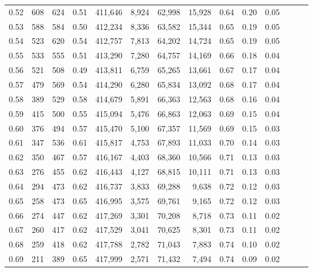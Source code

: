 \begin{tabular}{rrrrrrrrrrrrrr}
0.52 &     608 &    624 &  0.51 &  411,646 &    8,924 &  62,998 &  15,928 &  0.64 &  0.20 &      0.05 \\
0.53 &     588 &    584 &  0.50 &  412,234 &    8,336 &  63,582 &  15,344 &  0.65 &  0.19 &      0.05 \\
0.54 &     523 &    620 &  0.54 &  412,757 &    7,813 &  64,202 &  14,724 &  0.65 &  0.19 &      0.05 \\
0.55 &     533 &    555 &  0.51 &  413,290 &    7,280 &  64,757 &  14,169 &  0.66 &  0.18 &      0.04 \\
0.56 &     521 &    508 &  0.49 &  413,811 &    6,759 &  65,265 &  13,661 &  0.67 &  0.17 &      0.04 \\
0.57 &     479 &    569 &  0.54 &  414,290 &    6,280 &  65,834 &  13,092 &  0.68 &  0.17 &      0.04 \\
0.58 &     389 &    529 &  0.58 &  414,679 &    5,891 &  66,363 &  12,563 &  0.68 &  0.16 &      0.04 \\
0.59 &     415 &    500 &  0.55 &  415,094 &    5,476 &  66,863 &  12,063 &  0.69 &  0.15 &      0.04 \\
0.60 &     376 &    494 &  0.57 &  415,470 &    5,100 &  67,357 &  11,569 &  0.69 &  0.15 &      0.03 \\
0.61 &     347 &    536 &  0.61 &  415,817 &    4,753 &  67,893 &  11,033 &  0.70 &  0.14 &      0.03 \\
0.62 &     350 &    467 &  0.57 &  416,167 &    4,403 &  68,360 &  10,566 &  0.71 &  0.13 &      0.03 \\
0.63 &     276 &    455 &  0.62 &  416,443 &    4,127 &  68,815 &  10,111 &  0.71 &  0.13 &      0.03 \\
0.64 &     294 &    473 &  0.62 &  416,737 &    3,833 &  69,288 &   9,638 &  0.72 &  0.12 &      0.03 \\
0.65 &     258 &    473 &  0.65 &  416,995 &    3,575 &  69,761 &   9,165 &  0.72 &  0.12 &      0.03 \\
0.66 &     274 &    447 &  0.62 &  417,269 &    3,301 &  70,208 &   8,718 &  0.73 &  0.11 &      0.02 \\
0.67 &     260 &    417 &  0.62 &  417,529 &    3,041 &  70,625 &   8,301 &  0.73 &  0.11 &      0.02 \\
0.68 &     259 &    418 &  0.62 &  417,788 &    2,782 &  71,043 &   7,883 &  0.74 &  0.10 &      0.02 \\
0.69 &     211 &    389 &  0.65 &  417,999 &    2,571 &  71,432 &   7,494 &  0.74 &  0.09 &      0.02 \\

\end{tabular}
